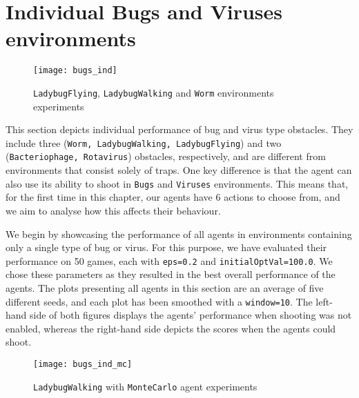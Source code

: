 \section{Individual Bugs and Viruses environments}
\begin{figure}[h]
    \centering
    \texttt{[image: bugs\_ind]}
    \caption{\texttt{LadybugFlying}, \texttt{LadybugWalking} and \texttt{Worm} environments experiments}
    \label{fig:bugs_ind_eg}
\end{figure}

This section depicts individual performance of bug and virus type obstacles. They include three (\texttt{Worm, LadybugWalking, LadybugFlying}) and two \\ (\texttt{Bacteriophage, Rotavirus}) obstacles, respectively, and are different from environments that consist solely of traps. One key difference is that the agent can also use its ability to shoot in \texttt{Bugs} and \texttt{Viruses} environments. This means that, for the first time in this chapter, our agents have 6 actions to choose from, and we aim to analyse how this affects their behaviour.

We begin by showcasing the performance of all agents in environments containing only a single type of bug or virus. For this purpose, we have evaluated their performance on 50 games, each with \texttt{eps=0.2} and \texttt{initialOptVal=100.0}. We chose these parameters as they resulted in the best overall performance of the agents. The plots presenting all agents in this section are an average of five different seeds, and each plot has been smoothed with a \texttt{window=10}. The left-hand side of both figures displays the agents' performance when shooting was not enabled, whereas the right-hand side depicts the scores when the agents could shoot.

\begin{figure}[h]
    \centering
    \texttt{[image: bugs\_ind\_mc]}
    \caption{\texttt{LadybugWalking} with \texttt{MonteCarlo} agent experiments}
    \label{fig:bugs_ind_mc_eg}
\end{figure}

